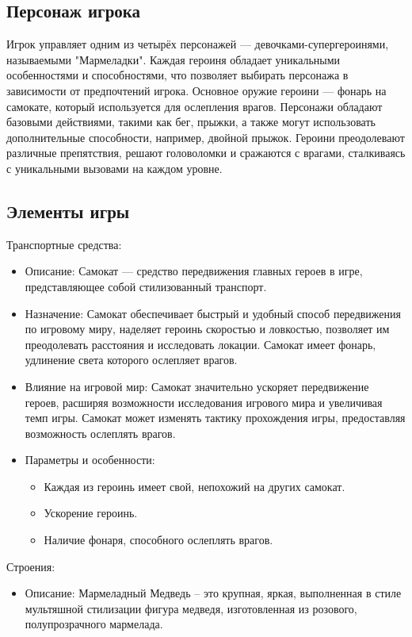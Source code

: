 \documentclass[article,12pt, fleqn]{article}
\begin{document}
\begin{itemize}
\subsection{Персонаж игрока}
Игрок управляет одним из четырёх персонажей — девочками-супергероинями, называемыми "Мармеладки". Каждая героиня обладает уникальными особенностями и способностями, что позволяет выбирать персонажа в зависимости от предпочтений игрока. Основное оружие героини — фонарь на самокате, который используется для ослепления врагов. Персонажи обладают базовыми действиями, такими как бег, прыжки, а также могут использовать дополнительные способности, например, двойной прыжок. Героини преодолевают различные препятствия, решают головоломки и сражаются с врагами, сталкиваясь с уникальными вызовами на каждом уровне.

\subsection{Элементы игры}
Транспортные средства:
\begin{itemize}
        \item Описание: Самокат — средство передвижения главных героев в игре, представляющее собой стилизованный транспорт.
        \item Назначение: Самокат обеспечивает быстрый и удобный способ передвижения по игровому миру, наделяет героинь скоростью и ловкостью, позволяет им преодолевать расстояния и исследовать локации. Самокат имеет фонарь, удлинение света которого ослепляет врагов.
        \item Влияние на игровой мир: Самокат значительно ускоряет передвижение героев, расширяя возможности исследования игрового мира и увеличивая темп игры. Самокат может изменять тактику прохождения игры, предоставляя возможность ослеплять врагов.
        \item Параметры и особенности: 
        \begin{itemize}
            \item Каждая из героинь имеет свой, непохожий на других самокат.
             \item Ускорение героинь.
              \item Наличие фонаря, способного ослеплять врагов.
        \end{itemize}
    \end{itemize}
Строения: 
    \begin{itemize}
        \item Описание: Мармеладный Медведь – это крупная, яркая, выполненная в стиле мультяшной стилизации фигура медведя, изготовленная из розового, полупрозрачного мармелада. 

\end{itemize}
\end{itemize}
\end{document}
